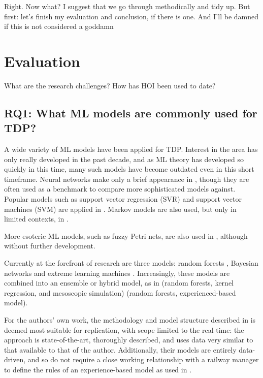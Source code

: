 \documentclass{article}
\begin{document}
Right. Now what?
I suggest that we go through methodically and tidy up.
But first: let's finish my evaluation and conclusion, if there is one. And I'll be damned if this is not considered a goddamn 


\clearpage

\section{Evaluation}

What are the research challenges?
How has HOI been used to date?

\subsection{RQ1: What ML models are commonly used for TDP?}

A wide variety of ML models have been applied for TDP. Interest in the area has only really developed in the past decade, and as ML theory has developed so quickly in this time, many such models have become outdated even in this short timeframe. 
Neural networks make only a brief appearance in \cite{yaghini_et_al_2011}, though they are often used as a benchmark to compare more sophisticated models against.
Popular models such as support vector regression (SVR) and support vector machines (SVM) are applied in \cite{markovic_et_al_2015} \cite{barbor_et_al_2019}. Markov models are also used, but only in limited contexts, in \cite{gaurav_et_al_2018} \cite{sahin_2017}. 

More esoteric ML models, such as fuzzy Petri nets, are also used in \cite{milinkovic_et_al_2013}, although without further development.

Currently at the forefront of research are three models: random forests \cite{oneto_et_al_2016} \cite{sabian_et_al_2019} \cite{oneto_et_al_2018} \cite{nair_et_al_2019}, Bayesian networks \cite{lessan_et_al_2019} \cite{corman_et_al_2018} and extreme learning machines \cite{oneto_et_al_2016} \cite{oneto_et_al_2017} \cite{oneto_et_al_2018}. Increasingly, these models are combined into an ensemble or hybrid model, as in \cite{nair_et_al_2019} (random forests, kernel regression, and mesoscopic simulation) \cite{oneto_et_al_2019} (random forests, experienced-based model).

For the authors' own work, the methodology and model structure described in \cite{nair_et_al_2019} is deemed most suitable for replication, with scope limited to the real-time: the approach is state-of-the-art, thoroughly described, and uses data very similar to that available to that of the author. Additionally, their models are entirely data-driven, and so do not require a close working relationship with a railway manager to define the rules of an experience-based model as used in \cite{oneto_et_al_2019}.
\end{document}
